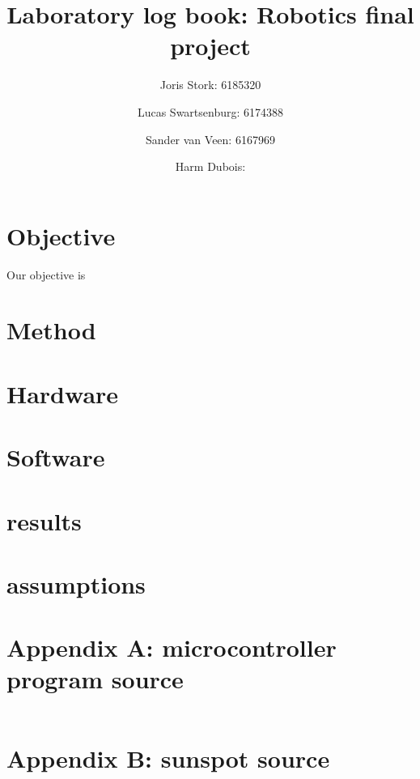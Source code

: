 \documentclass[a4paper, 12pt, titlepage]{article}
\author{Joris Stork: 6185320 \and Lucas Swartsenburg: 6174388 \and Sander van
Veen: 6167969 \and Harm Dubois: }
\title{Laboratory log book: Robotics final project}
\begin{document}
\maketitle

\section{Objective} %
Our objective is

\section{Method} %

\section{Hardware}

\section{Software}


\section{results} %

\section{assumptions} %


\newpage
\appendix

\section{Appendix A: microcontroller program source} %
\begin{verbatim}
\end{verbatim}

\section{Appendix B: sunspot source} %

\end{document}
